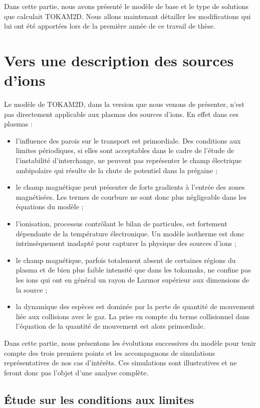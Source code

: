 \begin{refsection}
Dans cette partie, nous avons présenté le modèle de base et le type
de solutions que calculait TOKAM2D. Nous allons maintenant détailler les
modifications qui lui ont été apportées lors de la première année de ce travail
de thèse.

\section{Vers une description des sources d'ions}

Le modèle de TOKAM2D, dans la version que nous venons de présenter, n'est pas
directement applicable aux plasmas des sources d'ions. En effet dans
ces plasmas :

\begin{itemize}
	\item l'influence des parois sur le transport est primordiale. Des conditions
	aux limites périodiques, si elles sont acceptables dans le cadre de l'étude de
	l'instabilité d'interchange, ne peuvent pas représenter le champ électrique
	ambipolaire qui résulte de la chute de potentiel dans la prégaine ;
	\item le champ magnétique peut présenter de forts
	gradients à l'entrée des zones magnétisées. Les termes de courbure ne sont donc
	plus négligeable dans les équations du modèle ;
	\item l'ionisation, processus contrôlant le bilan de particules, est fortement
	dépendante de la température électronique. Un modèle isotherme est donc
	intrinsèquement inadapté pour capturer la physique des sources d'ions  ;
	\item le champ magnétique, parfois totalement absent de certaines régions du
	plasma et de bien plus faible intensité que dans les tokamaks, ne confine pas
	les ions qui ont en général un rayon de Larmor supérieur aux dimensions de la
	source ;
	\item la dynamique des espèces est dominée par la perte de
	quantité de mouvement liée aux collisions avec le gaz. La
	prise en compte du terme collisionnel dans l'équation de la quantité de
	mouvement est alors primordiale.
\end{itemize}

Dans cette partie, nous présentons les évolutions successives du modèle pour
tenir compte des trois premiers points et les accompagnons de simulations
représentatives de nos cas d'intérêts. Ces simulations sont illustratives et
ne feront donc pas l'objet d'une analyse complète.

\subsection{Étude sur les conditions aux limites}
	

\end{refsection}
